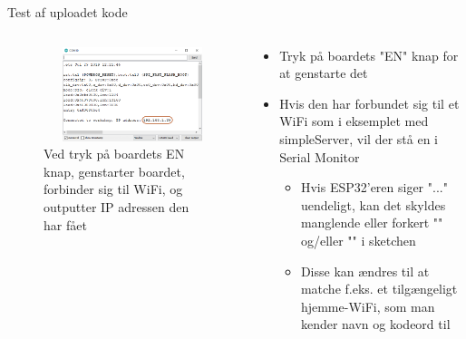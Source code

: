 \documentclass[aspectratio=169]{beamer}
\begin{document}
\begin{frame}{Test af uploadet kode}
\begin{columns}

	\begin{column}{0.5\textwidth}
		\begin{figure}
			\begin{columns}
				\begin{column}{0.2\textwidth}
  					
				\end{column}
				\begin{column}{0.7\textwidth}
  					\includegraphics[width=\textwidth,keepaspectratio=true]{assets/pictures/connected.png}
				\end{column}
			\end{columns}
			\caption{Ved tryk på boardets EN knap, genstarter boardet, forbinder sig til WiFi, og outputter IP adressen den har fået}
  			\label{fig:connected}
		\end{figure}
	\end{column}
	
	\begin{column}{0.5\textwidth}
		\begin{textBox}
			\begin{itemize}
				\item Tryk på boardets "EN" knap for at genstarte det
				\item Hvis den har forbundet sig til et WiFi som i eksemplet med simpleServer, vil der stå en  i Serial Monitor
				\begin{itemize}
					\item Hvis ESP32'eren siger "..." uendeligt, kan det skyldes manglende eller forkert "" og/eller "" i sketchen
					\item Disse kan ændres til at matche f.eks. et tilgængeligt hjemme-WiFi, som man kender navn og kodeord til
				\end{itemize}
			\end{itemize}
		\end{textBox}
	\end{column}
	
\end{columns}
\end{frame}
\end{document}
